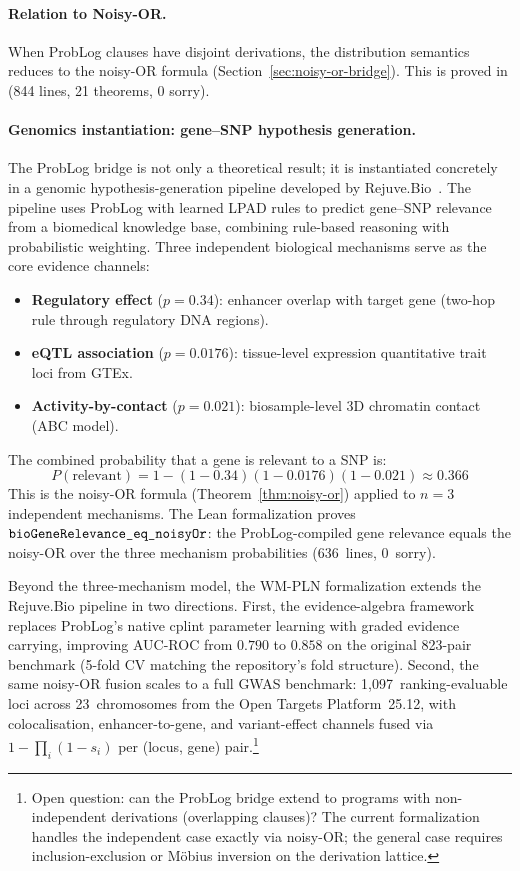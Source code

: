\documentclass[11pt,openany]{report}
\begin{document}
\paragraph{Relation to Noisy-OR.}
When ProbLog clauses have disjoint derivations, the distribution
semantics reduces to the noisy-OR formula
(Section~\ref{sec:noisy-or-bridge}).  This is proved in
 (844 lines, 21 theorems, 0 sorry).

\paragraph{Genomics instantiation: gene--SNP hypothesis generation.}
The ProbLog bridge is not only a theoretical result; it is
instantiated concretely in a genomic hypothesis-generation pipeline
developed by Rejuve.Bio~\cite{RejuveBioHypGen2025}.  The pipeline
uses ProbLog with learned LPAD rules to predict gene--SNP relevance
from a biomedical knowledge base, combining rule-based reasoning with
probabilistic weighting.  Three independent biological mechanisms
serve as the core evidence channels:
\begin{itemize}
\item \textbf{Regulatory effect} ($p = 0.34$): enhancer overlap with
  target gene (two-hop rule through regulatory DNA regions).
\item \textbf{eQTL association} ($p = 0.0176$): tissue-level
  expression quantitative trait loci from GTEx.
\item \textbf{Activity-by-contact} ($p = 0.021$): biosample-level 3D
  chromatin contact (ABC model).
\end{itemize}

\noindent
The combined probability that a gene is relevant to a SNP is:
\[
  P(\text{relevant}) = 1 - (1 - 0.34)(1 - 0.0176)(1 - 0.021) \approx 0.366
\]
This is the noisy-OR formula (Theorem~\ref{thm:noisy-or}) applied to
$n = 3$ independent mechanisms.  The Lean formalization proves
$\texttt{bioGeneRelevance\_eq\_noisyOr}$: the ProbLog-compiled gene
relevance equals the noisy-OR over the three mechanism probabilities
(636~lines, 0~sorry).

Beyond the three-mechanism model, the WM-PLN formalization extends the
Rejuve.Bio pipeline in two directions.  First, the evidence-algebra
framework replaces ProbLog's native cplint parameter learning with
graded evidence carrying, improving AUC-ROC from $0.790$ to $0.858$ on
the original 823-pair benchmark (5-fold CV matching the repository's
fold structure).  Second, the same noisy-OR fusion scales to a
full GWAS benchmark: 1{,}097~ranking-evaluable loci across
23~chromosomes from the Open Targets Platform~25.12, with
colocalisation, enhancer-to-gene, and variant-effect channels fused
via $1 - \prod_i(1 - s_i)$ per (locus, gene)
pair.\footnote{Open question: can the ProbLog bridge extend to
programs with non-independent derivations (overlapping clauses)?
The current formalization handles the independent case exactly via
noisy-OR; the general case requires inclusion-exclusion or
M\"{o}bius inversion on the derivation lattice.}
\end{document}
